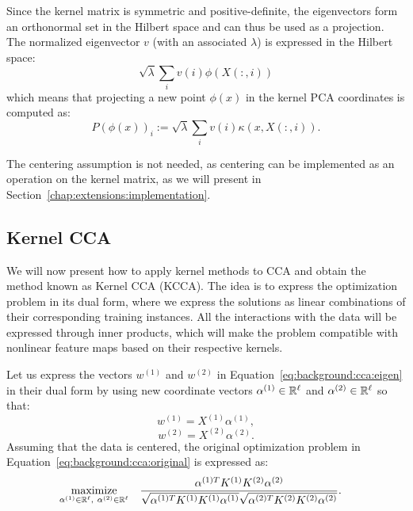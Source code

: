 Since the kernel matrix is symmetric and positive-definite, the eigenvectors form an orthonormal set in the Hilbert space and
can thus be used as a projection. The normalized eigenvector $v$ (with an associated $\lambda$) is expressed in the Hilbert space:
$$ \sqrt{\lambda} \sum_i v(i) \phi(X(:,i))$$
which means that projecting a new point $\phi(x)$ in the kernel PCA coordinates is computed as:
$$P(\phi(x))_i := \sqrt{\lambda} \sum_i v(i) \kappa(x, X(:,i)).$$

The centering assumption is not needed, as centering can be implemented as an operation on the kernel matrix, as we will
present in Section~\ref{chap:extensions:implementation}.

\subsection{Kernel CCA}

We will now present how to apply kernel methods to CCA and obtain the method known as Kernel CCA (KCCA).
The idea is to express the optimization problem in its dual form, where we express the solutions as
linear combinations of their corresponding training instances. All the interactions with the data
will be expressed through inner products, which will make the problem compatible with nonlinear feature
maps based on their respective kernels.

Let us express the vectors $w^{(1)}$ and $w^{(2)}$ in Equation~\ref{eq:background:cca:eigen} in their
dual form by using new coordinate vectors $\alpha^{(1)} \in \mathbb{R}^\ell$ and $\alpha^{(2)} \in \mathbb{R}^\ell$
so that:
$$w^{(1)} = X^{(1)} \alpha^{(1)},$$
$$w^{(2)} = X^{(2)} \alpha^{(2)}.$$
Assuming that the data is centered, the original optimization problem in Equation~\ref{eq:background:cca:original}
is expressed as:
\begin{equation}\label{eq:background:cca:original}
\begin{aligned}
& \underset{\alpha^{(1)} \in \mathbb{R}^{\ell},~\alpha^{(2)} \in \mathbb{R}^{\ell}}{\text{maximize}}
& & \frac{\alpha^{(1)T} K^{(1)} K^{(2)} \alpha^{(2)}}{\sqrt{\alpha^{(1)T} K^{(1)}K^{(1)} \alpha^{(1)}} \sqrt{\alpha^{(2)T} K^{(2)}K^{(2)} \alpha^{(2)}}}.
\end{aligned}
\end{equation}

